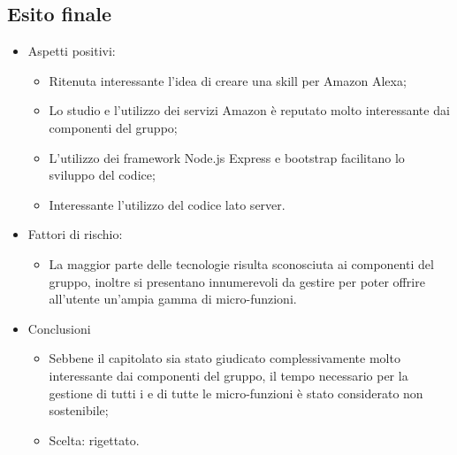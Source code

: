 \subsection{Esito finale}
    \begin{itemize}
        \item Aspetti positivi:
            \begin{itemize}
                \item Ritenuta interessante l'idea di creare una skill per Amazon Alexa;
                \item Lo studio e l'utilizzo dei servizi Amazon è reputato molto interessante dai componenti del gruppo;
                \item L'utilizzo dei framework Node.js Express e bootstrap facilitano lo sviluppo del codice;
                \item Interessante l'utilizzo del codice lato server.
            \end{itemize}
        \item Fattori di rischio:
            \begin{itemize}
                \item La maggior parte delle tecnologie risulta sconosciuta ai componenti del gruppo, inoltre si presentano innumerevoli  da gestire per poter offrire all'utente
		        un'ampia gamma di micro-funzioni.
            \end{itemize}
        \item Conclusioni
            \begin{itemize}
                \item Sebbene il capitolato sia stato giudicato complessivamente molto interessante dai componenti del gruppo, il tempo necessario per la gestione di tutti i 
		        e di tutte le micro-funzioni è stato considerato non sostenibile;
                \item Scelta: rigettato.
            \end{itemize}
    \end{itemize}